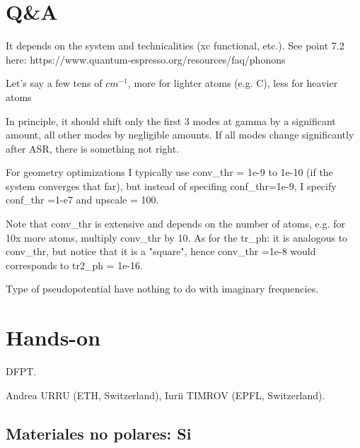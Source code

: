 \section{Q\&A}


  It depends on the system and technicalities (xc functional, etc.). See point 7.2 here: https://www.quantum-espresso.org/resources/faq/phonons

  Let's say a few tens of $cm^{-1}$, more for lighter atoms (e.g. C), less for heavier atoms


  In principle, it should shift only the first 3 modes at gamma by a significant amount, all other modes by negligible amounts. If all modes change significantly after ASR, there is something not right.


  For geometry optimizations I typically use conv\_thr = 1e-9 to 1e-10 (if the system converges that far), but instead of specifing conf\_thr=1e-9, I specify conf\_thr =1-e7 and upscale = 100.

  Note that conv\_thr is extensive and depends on the number of atoms, e.g. for 10x more atoms, multiply conv\_thr by 10.
  As for the tr\_ph: it is analogous to conv\_thr, but notice that it is a "square", hence conv\_thr =1e-8 would corresponds to tr2\_ph = 1e-16.

  Type of  pseudopotential have nothing to do with imaginary frequencies.

\section{Hands-on}

   DFPT.

   Andrea URRU (ETH, Switzerland), Iurii TIMROV (EPFL, Switzerland).

\subsection{Materiales no polares: Si}

